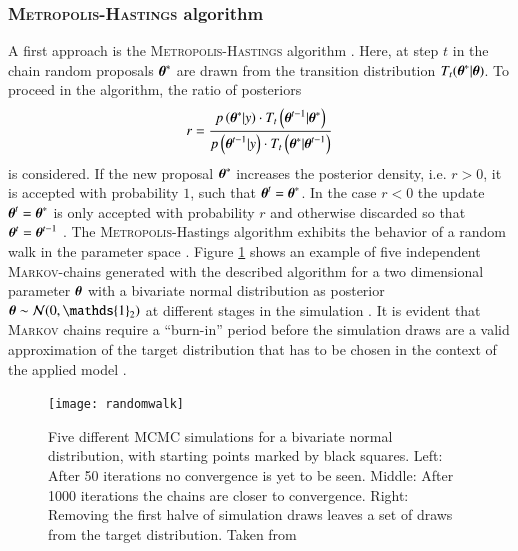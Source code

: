 \subsubsection{\textsc{Metropolis-Hastings} algorithm}
A first approach is the \textsc{Metropolis-Hastings} algorithm \cite{met,methast}. Here, at step $t$ in the chain random proposals $\boldsymbol{\theta}^*$ are drawn from the transition distribution $T_t(\boldsymbol{\theta}^*|\boldsymbol{\theta})$. To proceed in the algorithm, the ratio of posteriors
\begin{equation}
	r=\frac{p\left(\boldsymbol{\theta}^*|y\right)\cdot T_t\left(\boldsymbol{\theta}^{t-1}|\boldsymbol{\theta}^*\right)}{p\left(\boldsymbol{\theta}^{t-1}|y\right)\cdot  T_t\left(\boldsymbol{\theta}^*|\boldsymbol{\theta}^{t-1}\right)}
\end{equation} 
is considered. If the new proposal $\boldsymbol{\theta}^*$ increases the posterior density, i.e. $r>0$, it is accepted with probability $1$, such that $\boldsymbol{\theta}^t=\boldsymbol{\theta}^*$. In the case $r<0$ the update $\boldsymbol{\theta}^t=\boldsymbol{\theta}^*$ is only accepted with probability $r$ and otherwise discarded so that $\boldsymbol{\theta}^t=\boldsymbol{\theta}^{t-1}$ \cite{bayes}. The \textsc{Metropolis}-Hastings algorithm exhibits the behavior of a random walk in the parameter space \cite{bayes}. Figure \ref{fig:ex} shows an example of five independent \textsc{Markov}-chains generated with the described algorithm for a two dimensional parameter $\boldsymbol{\theta}$ with a bivariate normal distribution as posterior $\btheta\sim\mathcal{N}(0,\mathds{1}_2)$ at different stages in the simulation \cite{bayes}. It is evident that \textsc{Markov} chains require a \enquote{burn-in} period before the simulation draws are a valid approximation of the target distribution that has to be chosen in the context of the applied model \cite{bayes}.     
\begin{figure}[htbp]
\centering
\texttt{[image: randomwalk]}
\caption{Five different MCMC simulations for a bivariate normal distribution, with starting points marked by black squares. Left: After 50 iterations no convergence is yet to be seen. Middle: After 1000 iterations the chains are closer to convergence. Right: Removing the first halve of simulation draws leaves a set of draws from the target distribution. Taken from \cite{bayes}}
\label{fig:ex}
\end{figure}
